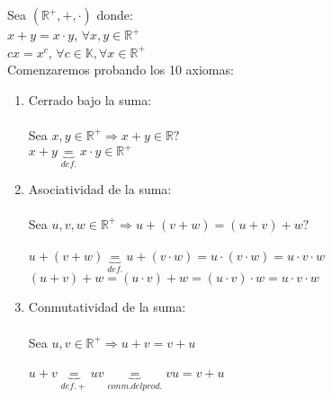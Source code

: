 \documentclass{article}
\begin{document}
\begin{enumerate}[1.]
Sea $(\mathbb{R}^+,+,\cdot)$ donde: \\
\hspace*{3cm} $x+y = x \cdot y$, $\forall x,y \in \mathbb{R}^+$ \\
\hspace*{3cm} $cx = x^c$, $\forall c \in \mathbb{K}, \forall x \in \mathbb{R}^+$ \\
Comenzaremos probando los 10 axiomas: \\ 
\begin{enumerate}[(1)]
\item
	Cerrado bajo la suma: \\ \\
	Sea $x,y \in \mathbb{R}^+ \Rightarrow x+y \in \mathbb{R}?$ \\
	$x+y \underbrace{=}_{def.} x \cdot y \in \mathbb{R}^+$
\item
	Asociatividad de la suma: \\ \\
	Sea $u,v,w \in \mathbb{R}^+ \Rightarrow u+(v+w) = (u+v)+w?$ \\ \\
	$u+(v+w) \underbrace{=}_{def.} u + (v \cdot w) = u \cdot ( v \cdot w) = u \cdot v \cdot w$ \\
	$(u+v)+w = (u \cdot v) + w = (u \cdot v ) \cdot w = u \cdot v \cdot w$

\item
	Conmutatividad de la suma: \\ \\
	Sea $u,v \in \mathbb{R}^+ \Rightarrow u+v = v+u$ \\ \\
	$u+v \underbrace{=}_{def.+} uv \underbrace{=}_{conm. del prod.} vu = v+u$


\end{enumerate}
\end{enumerate}
\end{document}
